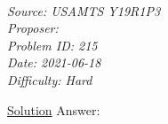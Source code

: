 \SSbreak\\
\emph{Source: USAMTS Y19R1P3}\\
\emph{Proposer: \Paiya}\\ %
\emph{Problem ID: 215}\\
\emph{Date: 2021-06-18}\\
\emph{Difficulty: Hard}\\
\SSbreak

\bigskip

\begin{solution}\hfil\medskip

\href{https://usamts.org/Solutions/Solution3_1_19.pdf}{Solution} Answer: 
\end{solution}\bigskip
